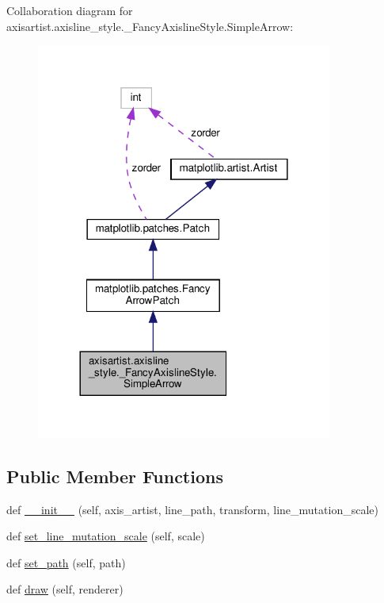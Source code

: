 Collaboration diagram for axisartist.\+axisline\+\_\+style.\+\_\+\+Fancy\+Axisline\+Style.\+Simple\+Arrow\+:
\nopagebreak
\begin{figure}[H]
\begin{center}
\leavevmode
\includegraphics[width=276pt]{classaxisartist_1_1axisline__style_1_1__FancyAxislineStyle_1_1SimpleArrow__coll__graph}
\end{center}
\end{figure}
\subsection*{Public Member Functions}
\begin{DoxyCompactItemize}
\item 
def \hyperlink{classaxisartist_1_1axisline__style_1_1__FancyAxislineStyle_1_1SimpleArrow_a7df12002451e93bc248c978d965bd650}{\+\_\+\+\_\+init\+\_\+\+\_\+} (self, axis\+\_\+artist, line\+\_\+path, transform, line\+\_\+mutation\+\_\+scale)
\item 
def \hyperlink{classaxisartist_1_1axisline__style_1_1__FancyAxislineStyle_1_1SimpleArrow_aac10a2152fd18d19cc86d75cb570c465}{set\+\_\+line\+\_\+mutation\+\_\+scale} (self, scale)
\item 
def \hyperlink{classaxisartist_1_1axisline__style_1_1__FancyAxislineStyle_1_1SimpleArrow_a27f2356680607060c376f4670b6a728c}{set\+\_\+path} (self, path)
\item 
def \hyperlink{classaxisartist_1_1axisline__style_1_1__FancyAxislineStyle_1_1SimpleArrow_a013919b1fde6933af4de22e1ff08134a}{draw} (self, renderer)
\end{DoxyCompactItemize}
